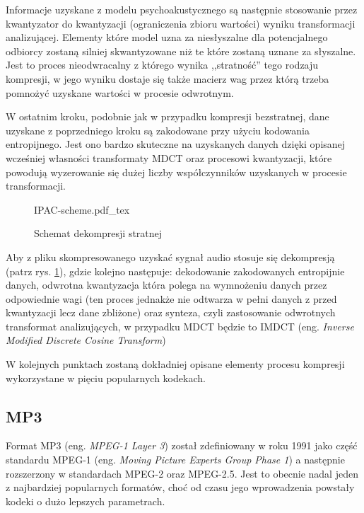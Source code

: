 \documentclass[pl,12pt]{aghdpl}
\let\Oldsubsection\subsection%
\renewcommand{\subsection}{\FloatBarrier\Oldsubsection}
\begin{document}
Informacje uzyskane z modelu psychoakustycznego są następnie stosowanie przez
kwantyzator do kwantyzacji (ograniczenia zbioru wartości) wyniku transformacji
analizującej. Elementy które model uzna za niesłyszalne dla potencjalnego
odbiorcy zostaną silniej skwantyzowane niż te które zostaną uznane za
słyszalne. Jest to proces nieodwracalny z którego wynika ,,stratność'' tego
rodzaju kompresji, w jego wyniku dostaje się także macierz wag przez którą
trzeba pomnożyć uzyskane wartości w procesie odwrotnym.

W ostatnim kroku, podobnie jak w przypadku kompresji bezstratnej, dane uzyskane
z poprzedniego kroku są zakodowane przy użyciu kodowania entropijnego. Jest ono
bardzo skuteczne na uzyskanych danych dzięki opisanej wcześniej własności
transformaty MDCT oraz procesowi kwantyzacji, które powodują wyzerowanie się
dużej liczby współczynników uzyskanych w procesie transformacji.

\begin{figure}[!tbh]
  \centering
  {IPAC-scheme.pdf_tex}
  \caption{Schemat dekompresji stratnej}
  \label{fig:IPAC_scheme}
\end{figure}

Aby z pliku skompresowanego uzyskać sygnał audio stosuje się dekompresją (patrz
rys. \ref{fig:IPAC_scheme}), gdzie kolejno następuje: dekodowanie zakodowanych
entropijnie danych, odwrotna kwantyzacja która polega na wymnożeniu danych
przez odpowiednie wagi (ten proces jednakże nie odtwarza w pełni danych z przed
kwantyzacji lecz dane zbliżone) oraz synteza, czyli zastosowanie odwrotnych
transformat analizujących, w przypadku MDCT będzie to IMDCT (eng.
\textit{Inverse Modified Discrete Cosine Transform})

W kolejnych punktach zostaną dokładniej opisane elementy procesu kompresji
wykorzystane w pięciu popularnych kodekach.

\subsection{MP3}
Format MP3 (eng. \textit{MPEG-1 Layer 3}) został zdefiniowany w roku 1991 jako część
standardu MPEG-1 (eng. \textit{Moving Picture Experts Group Phase 1}) a
następnie rozszerzony w standardach MPEG-2 oraz MPEG-2.5. Jest to obecnie
nadal jeden z najbardziej popularnych formatów, choć od czasu jego wprowadzenia
powstały kodeki o dużo lepszych parametrach.
\end{document}
